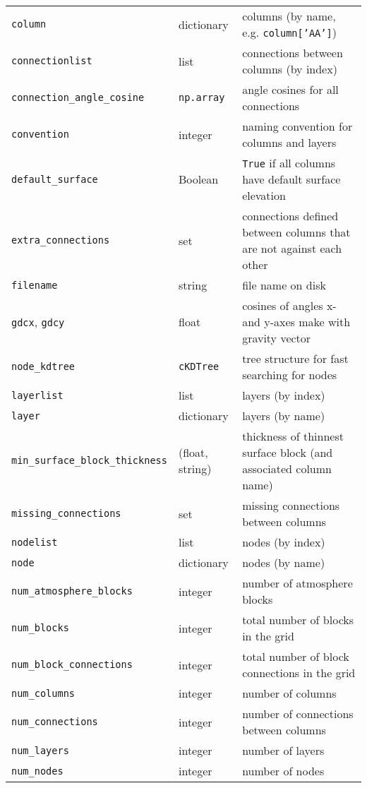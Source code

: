 \begin{center}
\begin{longtable}{|l|l|p{75mm}|}
    \texttt{column} & dictionary & columns (by name, e.g. \texttt{column['AA']})\\
    \texttt{connectionlist} & list & connections between columns (by index)\\
    \texttt{connection\_angle\_cosine} & \texttt{np.array} & angle cosines for all connections\\
    \texttt{convention} & integer & naming convention for columns and layers\\
    \texttt{default\_surface} & Boolean  & \texttt{True} if all columns have default surface elevation\\
    \texttt{extra\_connections} & set & connections defined between columns that are not against each other\\
    \texttt{filename} & string  & file name on disk\\
    \texttt{gdcx}, \texttt{gdcy} & float  & cosines of angles x- and y-axes make with gravity vector\\
    \texttt{node\_kdtree} & \texttt{cKDTree} & tree structure for fast searching for nodes \\
    \texttt{layerlist} & list & layers (by index)\\
    \texttt{layer} & dictionary & layers (by name)\\
    \texttt{min\_surface\_block\_thickness} & (float, string) & thickness of thinnest surface block (and associated column name)\\
    \texttt{missing\_connections} & set & missing connections between columns\\
    \texttt{nodelist} & list  & nodes (by index)\\
    \texttt{node} & dictionary  & nodes (by name)\\
    \texttt{num\_atmosphere\_blocks} & integer & number of atmosphere blocks\\
    \texttt{num\_blocks} & integer & total number of blocks in the grid\\
    \texttt{num\_block\_connections} & integer & total number of block connections in the grid\\
    \texttt{num\_columns} & integer & number of columns\\
    \texttt{num\_connections} & integer & number of connections between columns\\
    \texttt{num\_layers} & integer & number of layers\\
    \texttt{num\_nodes} & integer & number of nodes\\

\end{longtable}
\end{center}
